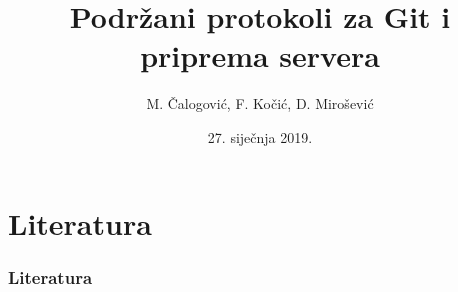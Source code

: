 \documentclass{beamer}
\title{Podržani protokoli za Git i priprema servera}
\author{M. Čalogović, F. Kočić, D. Mirošević}
\institute{Sveučilište u Rijeci - Tehnički fakultet}
\date{27. siječnja 2019.}
\begin{document}
\titlepage











\section{Literatura}
\begin{frame}
\frametitle{Literatura}


\end{frame}
\end{document}
